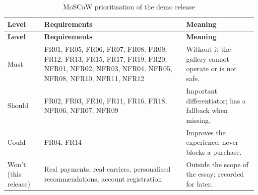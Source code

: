 \begin{longtable}{@{}P{2.4cm}P{6.3cm}P{6.3cm}@{}}
\caption{MoSCoW prioritisation of the demo release}\label{tab:moscow}\\
\toprule
\small \textbf{Level} & \small \textbf{Requirements} & \small \textbf{Meaning}\\
\midrule
\endfirsthead
\toprule
\small \textbf{Level} & \small \textbf{Requirements} & \small \textbf{Meaning}\\
\midrule
\endhead
\bottomrule
\endlastfoot
\small Must & \small FR01, FR05, FR06, FR07, FR08, FR09, FR12, FR13, FR15, FR17, FR19, FR20, NFR01, NFR02, NFR03, NFR04, NFR05, NFR08, NFR10, NFR11, NFR12 & \small Without it the gallery cannot operate or is not safe.\\
\small Should & \small FR02, FR03, FR10, FR11, FR16, FR18, NFR06, NFR07, NFR09 & \small Important differentiator; has a fallback when missing.\\
\small Could & \small FR04, FR14 & \small Improves the experience, never blocks a purchase.\\
\small Won't (this release) & \small Real payments, real carriers, personalised recommendations, account registration & \small Outside the scope of the essay; recorded for later.\\
\end{longtable}
